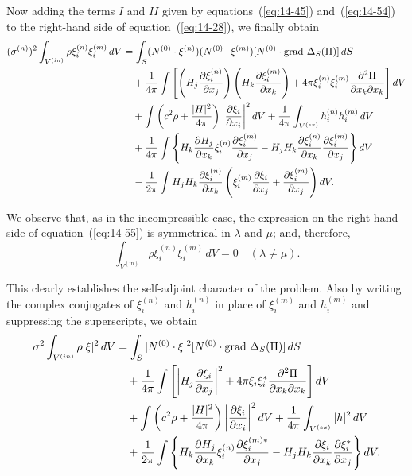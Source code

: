 Now adding the terms $I$ and $\mathit{II}$ given by equations~(\ref{eq:14-45}) and~(\ref{eq:14-54}) to the right-hand side of equation~(\ref{eq:14-28}), we finally obtain
\begin{align}
\label{eq:14-55}
(\sigma^{(n)})^2 \int_{V^{(\mathrm{in})}} \rho \xi_i^{(n)} \xi_i^{(m)} \, dV &= \int_S (\mathbf{N}^{(0)} \cdot \boldsymbol{\xi}^{(n)})(\mathbf{N}^{(0)} \cdot \boldsymbol{\xi}^{(m)})[\mathbf{N}^{(0)} \cdot \operatorname{grad}\, \Delta_S(\Pi)] \, dS \notag \\
&\quad + \frac{1}{4\pi} \int \left[\left(H_j \frac{\partial \xi_i^{(n)}}{\partial x_j}\right)\left(H_k \frac{\partial \xi_i^{(m)}}{\partial x_k}\right) + 4\pi \xi_i^{(n)} \xi_i^{(m)} \frac{\partial^2 \Pi}{\partial x_k \partial x_k}\right] dV \notag \\
&\quad + \int \left(c^2 \rho + \frac{|\mathbf{H}|^2}{4\pi}\right) \left|\frac{\partial \xi_i}{\partial x_i}\right|^2 dV + \frac{1}{4\pi} \int_{V^{(\mathrm{ex})}} h_i^{(n)} h_i^{(m)} \, dV \notag \\
&\quad + \frac{1}{4\pi} \int \left\{ H_k \frac{\partial H_j}{\partial x_k} \xi_i^{(n)} \frac{\partial \xi_i^{(m)}}{\partial x_j} - H_j H_k \frac{\partial \xi_i^{(n)}}{\partial x_k} \frac{\partial \xi_i^{(m)}}{\partial x_j} \right\} dV \notag \\
&\quad - \frac{1}{2\pi} \int H_j H_k \frac{\partial \xi_i^{(n)}}{\partial x_k} \left(\xi_i^{(m)} \frac{\partial \xi_i}{\partial x_j} + \frac{\partial \xi_i^{(m)}}{\partial x_j}\right) dV.
\end{align}

We observe that, as in the incompressible case, the expression on the right-hand side of equation~(\ref{eq:14-55}) is symmetrical in $\lambda$ and $\mu$; and, therefore,
\begin{equation}
\label{eq:14-56}
\int_{V^{(\mathrm{in})}} \rho \xi_i^{(n)} \xi_i^{(m)} \, dV = 0 \quad (\lambda \neq \mu).
\end{equation}

This clearly establishes the self-adjoint character of the problem. Also by writing the complex conjugates of $\xi_i^{(n)}$ and $h_i^{(n)}$ in place of $\xi_i^{(m)}$ and $h_i^{(m)}$ and suppressing the superscripts, we obtain
\begin{align}
\label{eq:14-57}
\sigma^2 \int_{V^{(\mathrm{in})}} \rho |\boldsymbol{\xi}|^2 \, dV &= \int_S |\mathbf{N}^{(0)} \cdot \boldsymbol{\xi}|^2 [\mathbf{N}^{(0)} \cdot \operatorname{grad}\, \Delta_S(\Pi)] \, dS \notag \\
&\quad + \frac{1}{4\pi} \int \left[\left|H_j \frac{\partial \xi_i}{\partial x_j}\right|^2 + 4\pi \xi_i \xi_i^* \frac{\partial^2 \Pi}{\partial x_k \partial x_k}\right] dV \notag \\
&\quad + \int \left(c^2 \rho + \frac{|\mathbf{H}|^2}{4\pi}\right) \left|\frac{\partial \xi_i}{\partial x_i}\right|^2 dV + \frac{1}{4\pi} \int_{V^{(\mathrm{ex})}} |\mathbf{h}|^2 \, dV \notag \\
&\quad + \frac{1}{2\pi} \int \left\{H_k \frac{\partial H_j}{\partial x_k} \xi_i^{(n)} \frac{\partial \xi_i^{(m)*}}{\partial x_j} - H_j H_k \frac{\partial \xi_i}{\partial x_k} \frac{\partial \xi_i^*}{\partial x_j}\right\} dV.
\end{align}

